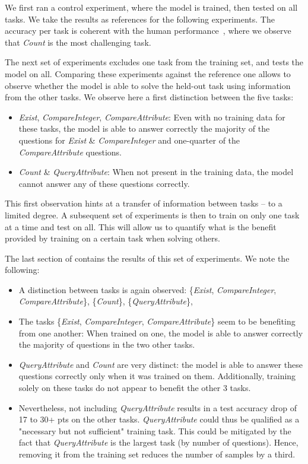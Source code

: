 We first ran a control experiment, where the model is trained, then tested on all tasks. We take the results as references for the following experiments. The accuracy per task is coherent with the human performance~\cite{johnson2017clevr}, where we observe that \textit{Count} is the most challenging task.

The next set of experiments excludes one task from the training set, and tests the model on all. Comparing these experiments against the reference one allows to observe whether the model is able to solve the held-out task using information from the other tasks.
We observe here a first distinction between the five tasks: 
\begin{itemize}
	\item \textit{Exist}, \textit{CompareInteger}, \textit{CompareAttribute}: Even with no training data for these tasks, the model is able to answer correctly the majority of the questions for \textit{Exist} \& \textit{CompareInteger} and one-quarter of the \textit{CompareAttribute} questions.
	\item \textit{Count} \& \textit{QueryAttribute}: When not present in the training data, the model cannot answer any of these questions correctly.
\end{itemize}

This first observation hints at a transfer of information between tasks -- to a limited degree. A subsequent set of experiments is then to train on only one task at a time and test on all. This will allow us to quantify what is the benefit provided by training on a certain task when solving others.

The last section of  contains the results of this set of experiments.
We note the following:
\begin{itemize}
	\item A distinction between tasks is again observed: \{\textit{Exist}, \textit{CompareInteger}, \textit{CompareAttribute}\}, \{\textit{Count}\}, \{\textit{QueryAttribute}\},
	\item The tasks \{\textit{Exist}, \textit{CompareInteger}, \textit{CompareAttribute}\} seem to be benefiting from one another: When trained on one, the model is able to answer correctly the majority of questions in the two other tasks.
	\item \textit{QueryAttribute} and \textit{Count} are very distinct: the model is able to answer these questions correctly only when it was trained on them. Additionally, training solely on these tasks do not appear to benefit the other 3 tasks.
	\item Nevertheless, not including \textit{QueryAttribute} results in a test accuracy drop of 17 to 30+ pts on the other tasks. \textit{QueryAttribute} could thus be qualified as a "necessary but not sufficient" training task. This could be mitigated by the fact that \textit{QueryAttribute} is the largest task (by number of questions). Hence, removing it from the training set reduces the number of samples by a third.
\end{itemize}



